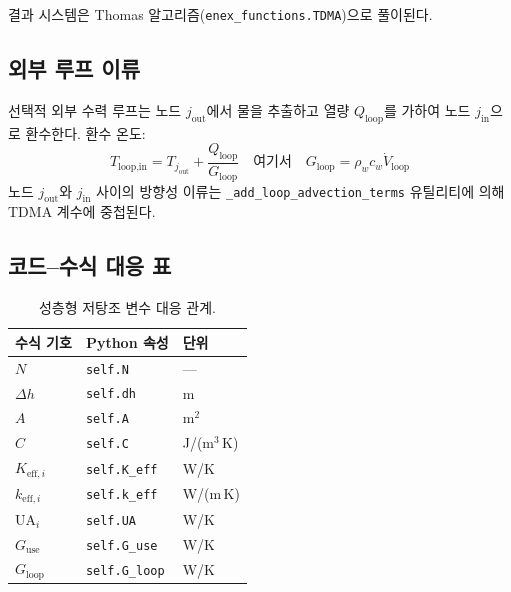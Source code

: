 결과 시스템은 Thomas 알고리즘(\texttt{enex\_functions.TDMA})으로 풀이된다.

\subsection{외부 루프 이류}

선택적 외부 수력 루프는 노드 $j_\text{out}$에서 물을 추출하고 열량 $Q_\text{loop}$를 가하여 노드 $j_\text{in}$으로 환수한다. 환수 온도:
\begin{equation}\label{eq:tank-Tloop}
  T_\text{loop,in} = T_{j_\text{out}} + \frac{Q_\text{loop}}{G_\text{loop}}
  \quad\text{여기서}\quad G_\text{loop} = \rho_w c_w \dot{V}_\text{loop}
\end{equation}
노드 $j_\text{out}$와 $j_\text{in}$ 사이의 방향성 이류는 \texttt{\_add\_loop\_advection\_terms} 유틸리티에 의해 TDMA 계수에 중첩된다.

\subsection{코드--수식 대응 표}

\begin{table}[h!]
\centering
\caption{성층형 저탕조 변수 대응 관계.}
\label{tab:tank-mapping}
\begin{tabular}{@{}lll@{}}
\toprule
수식 기호 & Python 속성 & 단위 \\
\midrule
$N$                   & \texttt{self.N}        & --- \\
$\Delta h$            & \texttt{self.dh}       & m   \\
$A$                   & \texttt{self.A}        & m$^2$ \\
$C$                   & \texttt{self.C}        & J/(m$^3$\,K) \\
$K_{\text{eff},i}$    & \texttt{self.K\_eff}   & W/K \\
$k_{\text{eff},i}$    & \texttt{self.k\_eff}   & W/(m\,K) \\
$\text{UA}_i$         & \texttt{self.UA}       & W/K \\
$G_\text{use}$        & \texttt{self.G\_use}   & W/K \\
$G_\text{loop}$       & \texttt{self.G\_loop}  & W/K \\
\bottomrule
\end{tabular}
\end{table}
